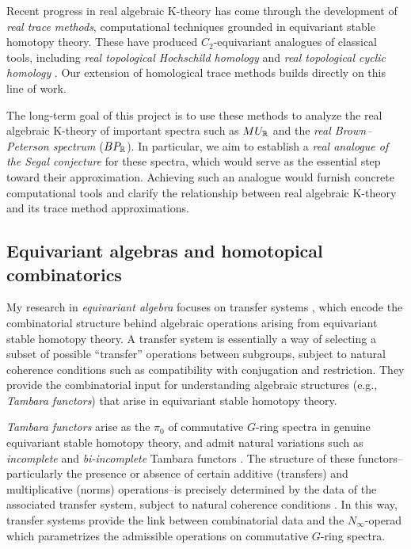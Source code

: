\documentclass[11pt]{article}
\begin{document}
Recent progress in real algebraic K-theory has come through the development of {\it real trace methods}, computational techniques grounded in equivariant stable homotopy theory.
These have produced $C_2$-equivariant analogues of classical tools, including {\it real topological Hochschild homology} \cite{Dotto} and {\it real topological cyclic homology} \cite{Hogenhaven}.
Our extension of homological trace methods builds directly on this line of work.

The long-term goal of this project is to use these methods to analyze the real algebraic K-theory of important spectra such as $MU_{\mathbb{R}}$ and the {\it real Brown–Peterson spectrum} ($BP_{\mathbb{R}}$).
In particular, we aim to establish a {\it real analogue of the Segal conjecture} for these spectra, which would serve as the essential step toward their approximation.
Achieving such an analogue would furnish concrete computational tools and clarify the relationship between real algebraic K-theory and its trace method approximations.


\subsection{Equivariant algebras and homotopical combinatorics}
My research in {\it equivariant algebra} focuses on transfer systems \cite{MR4244201}, which encode the combinatorial structure behind algebraic operations arising from equivariant stable homotopy theory.
A transfer system is essentially a way of selecting a subset of possible ``transfer'' operations between subgroups, subject to natural coherence conditions such as compatibility with conjugation and restriction.
They provide the combinatorial input for understanding algebraic structures (e.g., {\it Tambara functors}) that arise in equivariant stable homotopy theory.

{\it Tambara functors} \cite{MR1209937} arise as the $\pi_0$ of commutative $G$-ring spectra in genuine equivariant stable homotopy theory, and admit natural variations such as {\it incomplete} and {\it bi-incomplete} Tambara functors \cite{MR3773736,MR4327103}.
The structure of these functors--particularly the presence or absence of certain additive (transfers) and multiplicative (norms) operations--is precisely determined by the data of the associated transfer system, subject to natural coherence conditions \cite{MR4696086}.
In this way, transfer systems provide the link between combinatorial data and the $N_\infty$-operad which parametrizes the admissible operations on commutative $G$-ring spectra.
\end{document}
